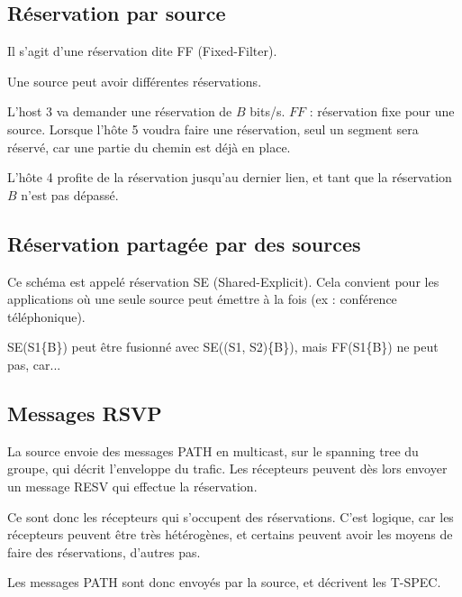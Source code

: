 			
			\subsection{Réservation par source}
			
			Il s'agit d'une réservation dite FF (Fixed-Filter).
			
			
			Une source peut avoir différentes réservations.
			
			
			L'host 3 va demander une réservation de $B$ bits/s. $FF$ : réservation fixe pour une source. Lorsque l'hôte 5 voudra faire une réservation, seul un segment sera réservé, car une partie du chemin est déjà en place.
			
			L'hôte 4 profite de la réservation jusqu'au dernier lien, et tant que la réservation $B$ n'est pas dépassé.
			
			\subsection{Réservation partagée par des sources}
			
			Ce schéma est appelé réservation SE (Shared-Explicit). Cela convient pour les applications où une seule source peut émettre à la fois (ex : conférence téléphonique).
			
			
		
			SE(S1\{B\}) peut être fusionné avec SE((S1, S2)\{B\}), mais FF(S1\{B\}) ne peut pas, car...
		
		
			\subsection{Messages RSVP}
			
			La source envoie des messages PATH en multicast, sur le spanning tree du groupe, qui décrit l'enveloppe du trafic. Les récepteurs peuvent dès lors envoyer un message RESV qui effectue la réservation.
			
			
			Ce sont donc les récepteurs qui s'occupent des réservations. C'est logique, car les récepteurs peuvent être très hétérogènes, et certains peuvent avoir les moyens de faire des réservations, d'autres pas.
			
			Les messages PATH sont donc envoyés par la source, et décrivent les T-SPEC.
			
